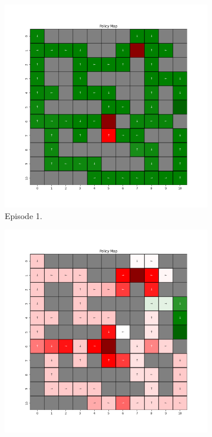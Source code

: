 \documentclass{assignment}
\begin{document}
\begin{figure}[H]
    \begin{subfigure}{0.3\textwidth}
        \includegraphics[width=\textwidth]{figures/policy_td/alpha_sweep/policy_alpha_1_gamma_0.95_epsilon_0.2_iteration_1.png}
    \caption{Episode 1.}
    \end{subfigure}\hfill
    \begin{subfigure}{0.3\textwidth}
        \includegraphics[width=\textwidth]{figures/policy_td/alpha_sweep/policy_alpha_1_gamma_0.95_epsilon_0.2_iteration_50.png}

\end{subfigure}
\end{figure}
\end{document}
